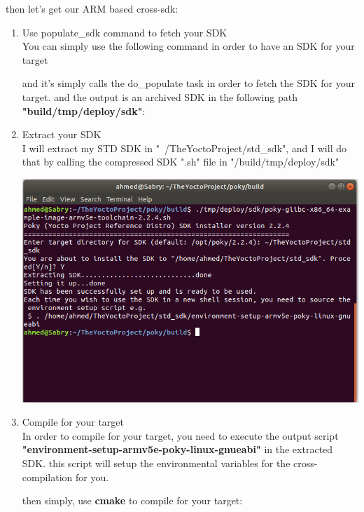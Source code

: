 \documentclass{article}
\begin{document}
\begin{enumerate}
  then let's get our ARM based cross-sdk:
  \begin{enumerate}
    \item Use populate\_sdk command to fetch your SDK\\
    You can simply use the following command in order to have an SDK for your target
    
    
    and it's simply calls the do\_populate task in order to fetch the SDK for your target. and the output is an archived SDK in the following path \textbf{"build/tmp/deploy/sdk"}:
    

    \item Extract your SDK\\
    I will extract my STD SDK in "~/TheYoctoProject/std\_sdk", and I will do that by calling the compressed SDK ".sh" file in "/build/tmp/deploy/sdk"
    
    
    \begin{center}
      \includegraphics[scale=0.6]{./resources/img/std_sdk_extract.png}
    \end{center}

    \item Compile for your target\\
    In order to compile for your target, you need to execute the output script \textbf{"environment-setup-armv5e-poky-linux-gnueabi"} in the extracted SDK. this script will setup the environmental variables for the cross-compilation for you.

    
    then simply, use \textbf{cmake} to compile for your target:


\end{enumerate}
\end{enumerate}
\end{document}
